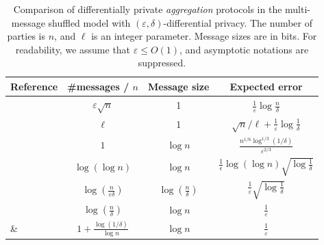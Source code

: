 \documentclass[11pt]{article}
\begin{document}
\begin{table}[t]
    \centering
    \footnotesize
    \def\arraystretch{1.75}
    \begin{tabular}{@{}lccc@{}}
        \toprule
        {\bf Reference} & 
        {\bf \#messages / $n$} & 
        {\bf Message size} & 
        {\bf Expected error}\\
        \midrule
        \cite{cheu2019distributed} & 
        $\varepsilon\sqrt{n}$
        & 1 
        & $\frac{1}{\varepsilon} \log\frac{n}{\delta}$
        \\
        \cite{cheu2019distributed}
        & $\ell$
        & 1 
        &
        $\sqrt{n} / \ell + \frac{1}{\varepsilon} \log\frac{1}{\delta}$
        \\
        \cite{BalleBGN19} & $1$ & $\log n$ & $\frac{n^{1/6}\log^{1/3}(1/\delta)}{\varepsilon^{2/3}}$\\
        \cite{balle2020} &
        $\log (\log n)$ &
        $\log n$ &
        $\frac{1}{\epsilon} \log(\log n )\sqrt{\log \frac{1}{\delta}}$ \\        
        \cite{ghazi2019scalable_1} &
        $\log(\frac{n}{\varepsilon \delta})$ & $\log(\frac{n}{\delta})$ & $\frac{1}{\varepsilon} \sqrt{\log\frac{1}{\delta}}$\\ 
        \cite{balle2020} &
        $\log(\frac{n}{\delta})$ & $\log n$ & $\frac{1}{\varepsilon}$\\         
        \cite{ghazi2019scalable} \& \cite{balle2020} & $1 + \frac{\log(1/\delta)}{\log n}$ & $\log n$ & $\frac{1}{\varepsilon}$ \\
        \bottomrule
    \end{tabular}
    \caption{Comparison of differentially private \emph{aggregation} protocols in the multi-message shuffled model with $(\varepsilon,\delta)$-differential privacy. 
    The number of parties is $n$, and $\ell$ is an integer parameter.
    Message sizes are in bits. For readability, we assume that $\varepsilon \leq O(1)$, and asymptotic notations are suppressed.
    }
    \label{table:aggregation_shuffled_comparison}
\end{table}
\end{document}
